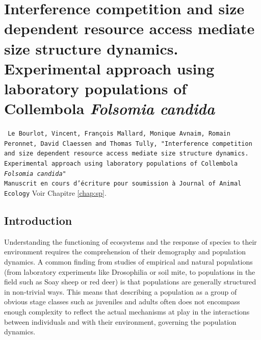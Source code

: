 \chapter{Interference competition and size dependent resource
access mediate size structure dynamics. Experimental approach using laboratory
populations of Collembola \textit{Folsomia candida}}\label{Ann:SP}

\vspace{2cm}

\begin{Spacing}{1}
\texttt{
Le Bourlot, Vincent, François Mallard, Monique Avnaim, Romain Peronnet, David
Claessen and Thomas Tully, "Interference competition and size dependent resource
access mediate size structure dynamics. Experimental approach using laboratory
populations of Collembola \textit{Folsomia candida}"\\
Manuscrit en cours d'écriture pour soumission à Journal of Animal Ecology}
Voir Chapitre \ref{chap:sp}.
\end{Spacing}


\section{Introduction}

Understanding the functioning of ecosystems and the response of species to their
environment requires the comprehension of their demography and population
dynamics. A common finding from studies of empirical and natural populations
(from laboratory experiments like Drosophilia  or soil mite, to populations in
the field such as Soay sheep  or red deer) is that populations are generally
structured in non-trivial ways.
This means that describing a population as a group of obvious stage classes such
as juveniles and adults often does not encompass enough complexity to reflect
the actual mechanisms at play in the interactions between individuals and with their
environment, governing the population dynamics.

